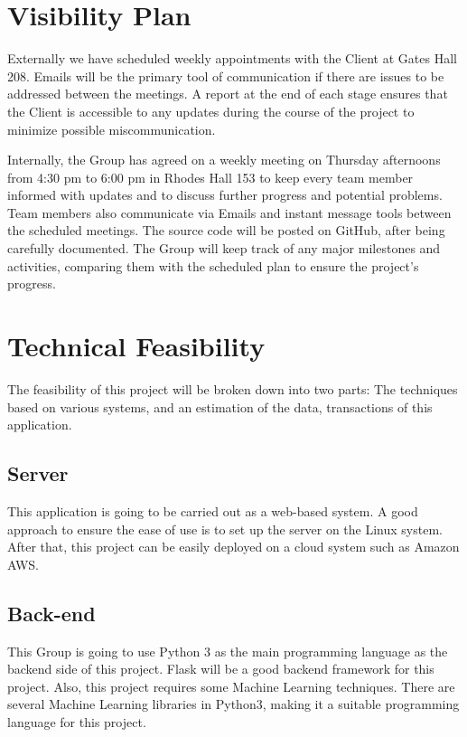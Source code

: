 \documentclass{article}
\begin{document}
\section{Visibility Plan}
Externally we have scheduled weekly appointments with the Client at Gates Hall 208. Emails will be the primary tool of communication if there are issues to be addressed between the meetings. A report at the end of each stage ensures that the Client is accessible to any updates during the course of the project to minimize possible miscommunication.

\vspace{0.4cm}Internally, the Group has agreed on a weekly meeting on Thursday afternoons from 4:30 pm to 6:00 pm in Rhodes Hall 153 to keep every team member informed with updates and to discuss further progress and potential problems. Team members also communicate via Emails and instant message tools between the scheduled meetings. The source code will be posted on GitHub, after being carefully documented. The Group will keep track of any major milestones and activities, comparing them with the scheduled plan to ensure the project’s progress.

\section{Technical Feasibility}
The feasibility of this project will be broken down into two parts: The techniques based on various systems, and an estimation of the data, transactions of this application.
\subsection{Server}
This application is going to be carried out as a web-based system. A good approach to ensure the ease of use is to set up the server on the Linux system. After that, this project can be easily deployed on a cloud system such as Amazon AWS.
\subsection{Back-end}
This Group is going to use Python 3 as the main programming language as the backend side of this project. Flask will be a good backend framework for this project. Also, this project requires some Machine Learning techniques.  There are several Machine Learning libraries in Python3, making it a suitable programming language for this project.
\end{document}
